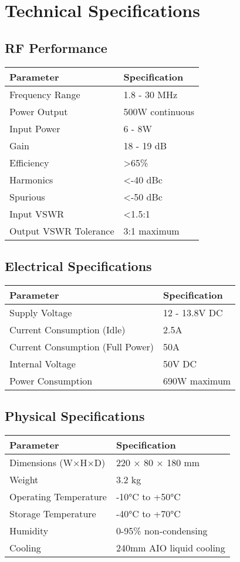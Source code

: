 \documentclass[11pt,a4paper]{article}
\begin{document}
\section{Technical Specifications}

\subsection{RF Performance}
\begin{center}
\begin{tabular}{|l|l|}
\hline
\textbf{Parameter} & \textbf{Specification} \\
\hline
Frequency Range & 1.8 - 30 MHz \\
Power Output & 500W continuous \\
Input Power & 6 - 8W \\
Gain & 18 - 19 dB \\
Efficiency & >65\% \\
Harmonics & <-40 dBc \\
Spurious & <-50 dBc \\
Input VSWR & <1.5:1 \\
Output VSWR Tolerance & 3:1 maximum \\
\hline
\end{tabular}
\end{center}

\subsection{Electrical Specifications}
\begin{center}
\begin{tabular}{|l|l|}
\hline
\textbf{Parameter} & \textbf{Specification} \\
\hline
Supply Voltage & 12 - 13.8V DC \\
Current Consumption (Idle) & 2.5A \\
Current Consumption (Full Power) & 50A \\
Internal Voltage & 50V DC \\
Power Consumption & 690W maximum \\
\hline
\end{tabular}
\end{center}

\subsection{Physical Specifications}
\begin{center}
\begin{tabular}{|l|l|}
\hline
\textbf{Parameter} & \textbf{Specification} \\
\hline
Dimensions (W×H×D) & 220 × 80 × 180 mm \\
Weight & 3.2 kg \\
Operating Temperature & -10°C to +50°C \\
Storage Temperature & -40°C to +70°C \\
Humidity & 0-95\% non-condensing \\
Cooling & 240mm AIO liquid cooling \\
\hline
\end{tabular}
\end{center}
\end{document}
